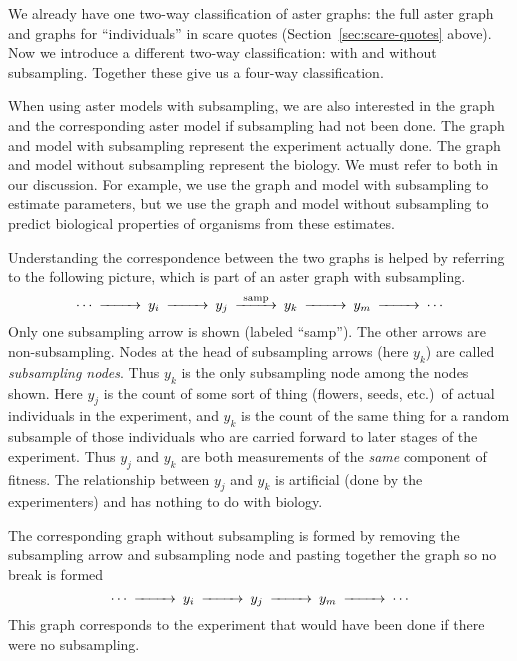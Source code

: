We already have one two-way classification of aster graphs: the full aster
graph and graphs for ``individuals'' in scare quotes
(Section~\ref{sec:scare-quotes} above).  Now we introduce a different
two-way classification: with and without subsampling.  Together these give
us a four-way classification.

When using aster models with subsampling, we are also interested in the graph
and the corresponding aster model if subsampling had not been done.
The graph and model with subsampling represent the experiment actually done.
The graph and model without subsampling represent the biology.
We must refer to both in our discussion.  For example, we use the graph
and model with subsampling to estimate parameters, but we use the graph
and model without subsampling to predict biological properties of
organisms from these estimates.

Understanding the correspondence between the two graphs is helped by
referring to the following picture, which is part of an aster graph
with subsampling.
\begin{equation} \label{graph:with}
\begin{CD}
   \cdots @>>> y_i @>>> y_j @>\text{samp}>> y_k @>>> y_m @>>> \cdots
\end{CD}
\end{equation}
Only one subsampling arrow is shown (labeled ``samp'').  The other arrows
are non-subsampling.  Nodes at the head of subsampling arrows (here $y_k$)
are called \emph{subsampling nodes}.  Thus $y_k$ is the only subsampling node
among the nodes shown.
Here $y_j$ is the count of some
sort of thing (flowers, seeds, etc.)\ of actual individuals in the experiment,
and $y_k$ is the count of the same thing for a random subsample of those
individuals who are
carried forward to later stages of the experiment.
Thus $y_j$ and $y_k$ are both measurements of
the \emph{same} component of fitness.
The relationship between
$y_j$ and $y_k$ is artificial (done by the experimenters) and has nothing
to do with biology.

The corresponding graph without subsampling is formed by removing the
subsampling arrow and subsampling node and pasting together the graph
so no break is formed
\begin{equation} \label{graph:without}
\begin{CD}
   \cdots @>>> y_i @>>> y_j @>>> y_m @>>> \cdots
\end{CD}
\end{equation}
This graph corresponds to the experiment that would have been done if there
were no subsampling.


